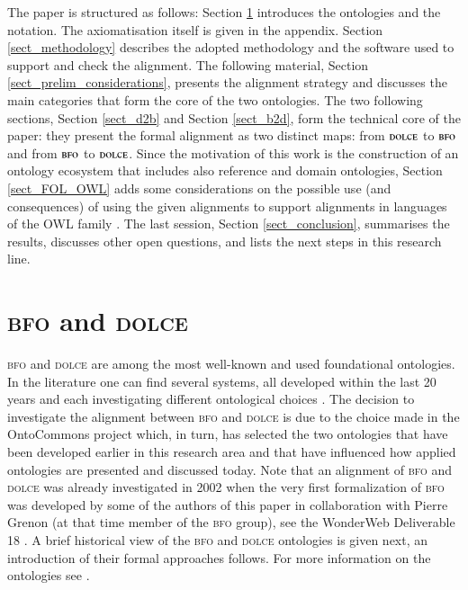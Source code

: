 \documentclass[ao]{iosart2x}
\newcommand{\dolce}{{\textsc{dolce}}}
\newcommand{\bfo}{{\textsc{bfo}}}
\begin{document}
The paper is structured as follows: 
Section \ref{sect_bfo_and_dolce} introduces the ontologies and the notation. The axiomatisation itself is given in the appendix. 
Section \ref{sect_methodology} describes the adopted methodology and the software used to support and check the alignment. 
The following material, Section \ref{sect_prelim_considerations}, presents the alignment strategy and discusses the main categories that form the core of the two ontologies. 
The two following sections, Section \ref{sect_d2b} and Section \ref{sect_b2d}, form the technical core of the paper: they present the formal alignment as two distinct maps: from $\dolce$ to $\bfo$ and from $\bfo$ to $\dolce$. 
Since the motivation of this work is the construction of an ontology ecosystem that includes also reference and domain ontologies, Section \ref{sect_FOL_OWL} adds some considerations on the possible use (and consequences) of using the given alignments to support alignments in languages of the OWL family \citep{OWL}. 
The last session, Section \ref{sect_conclusion}, summarises the results, discusses other open questions, and lists the next steps in this research line.


\section{{\bfo} and {\dolce}}
\label{sect_bfo_and_dolce}


{\bfo} and {\dolce} are among the most well-known and used foundational ontologies. In the literature one can find several systems, all developed within the last 20 years and each investigating different ontological choices \cite{guarino}. The decision to investigate the alignment between {\bfo} and {\dolce} is due to the choice made in the OntoCommons project which, in turn, has selected the two ontologies that have been developed earlier in this research area and that have influenced how applied ontologies are presented and discussed today. Note that an alignment of {\bfo} and {\dolce} was already investigated in 2002 when the very first formalization of {\bfo} was developed by some of the authors of this paper in collaboration with Pierre Grenon (at that time member of the {\bfo} group), see the WonderWeb Deliverable 18 \citet{D18}.
A brief historical view of the {\bfo} and {\dolce} ontologies is given next, an introduction of their formal approaches follows. For more information on the ontologies see \citep{ISO21838, borgoDOLCEDescriptiveOntology2022}.
\end{document}
